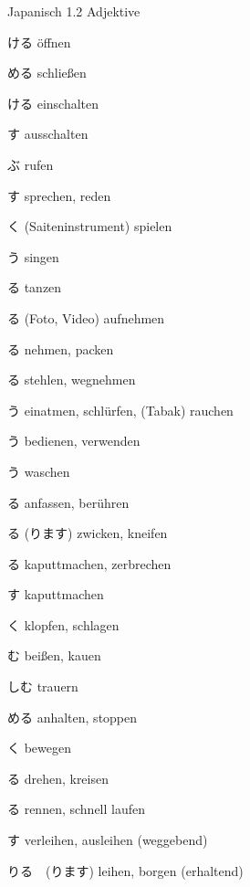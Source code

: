 \begin{multicols*}{2}
\begin{flushleft}
\begin{labeling}{Japanisch 1.2 Adjektive}
	\item [\ruby{開}{あ}ける] öffnen
	\item [\ruby{閉}{し}める] schließen
	\item [\ruby{点}{つ}ける] einschalten
	\item [\ruby{消}{け}す] ausschalten
	
	\item [\ruby{呼}{よ}ぶ] rufen
	\item [\ruby{話}{はな}す] sprechen, reden
	
	\item [\ruby{弾}{ひ}く] (Saiteninstrument) spielen
	\item [\ruby{歌}{うた}う] singen
	\item [\ruby{踊}{おど}る] tanzen
	
	\item [\ruby{撮}{と}る] (Foto, Video) aufnehmen
	\item [\ruby{取}{と}る] nehmen, packen
	\item [\ruby{盗}{と}る] stehlen, wegnehmen
	
	\item [\ruby{吸}{す}う] einatmen, schlürfen, (Tabak) rauchen
	\item [\ruby{使}{つか}う] bedienen, verwenden
	\item [\ruby{洗}{あら}う] waschen
	
	\item [\ruby{触}{さわ}る] anfassen, berühren
	\item [\ruby{抓}{つね}る (\ruby{抓}{つね}ります)] zwicken, kneifen
	\item [\ruby{割}{わ}る] kaputtmachen, zerbrechen
	\item [\ruby{毀}{こわ}す] kaputtmachen
	\item [\ruby{叩}{たた}く] klopfen, schlagen
	\item [\ruby{噛}{か}む] beißen, kauen
	
	\item [\ruby{悲}{かな}しむ] trauern
	
	\item [\ruby{止}{と}める] anhalten, stoppen
	\item [\ruby{動}{うご}く] bewegen
	\item [\ruby{回}{まわ}る] drehen, kreisen
	\item [\ruby{走}{はし}る] rennen, schnell laufen
	
	\item [\ruby{貸}{か}す] verleihen, ausleihen (weggebend)
	\item [\ruby{借}{か}りる　(\ruby{借}{か}ります)] leihen, borgen (erhaltend)
	

\end{labeling}
\end{flushleft}
\end{multicols*}
